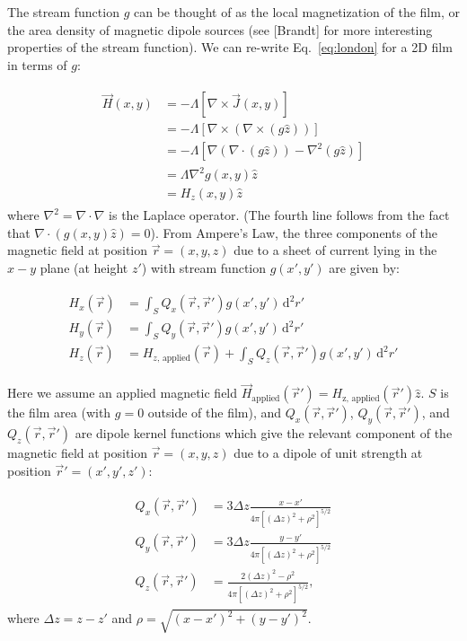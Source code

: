 \documentclass{article}
\begin{document}
The stream function $g$ can be thought of as the local magnetization of the film, or the area density of magnetic dipole sources (see [Brandt] for more interesting properties of the stream function). We can re-write Eq.~\ref{eq:london} for a 2D film in terms of $g$:

\begin{align}
    \label{eq:london_stream}
    \begin{split}
        \vec{H}(x, y) &= -\Lambda\left[\nabla\times\vec{J}(x, y)\right]\\
        &= -\Lambda\left[\nabla\times\left(\nabla\times(g\hat{z})\right)\right]\\
        &= -\Lambda\left[\nabla(\nabla\cdot(g\hat{z}))-\nabla^2(g\hat{z})\right]\\
        &=\Lambda\nabla^2g(x,y)\hat{z}\\
        &=H_z(x, y)\hat{z}
    \end{split}
\end{align}
where $\nabla^2=\nabla\cdot\nabla$ is the Laplace operator. (The fourth line follows from the fact that $\nabla\cdot\left(g(x,y)\hat{z}\right) = 0$). From Ampere's Law, the three components of the magnetic field at position $\vec{r}=(x, y, z)$ due to a sheet of current lying in the $x-y$ plane (at height $z'$) with stream function $g(x', y')$ are given by:

\begin{align}
    \label{eq:field_from_kernel}
    \begin{split}
        H_x(\vec{r}) &= \int_S Q_x(\vec{r},\vec{r}')g(x', y')\,\mathrm{d}^2r'\\
        H_y(\vec{r}) &= \int_S Q_y(\vec{r},\vec{r}')g(x', y')\,\mathrm{d}^2r'\\
        H_z(\vec{r}) &= H_{z,\,\mathrm{applied}}(\vec{r})
        + \int_S Q_z(\vec{r},\vec{r}')g(x', y')\,\mathrm{d}^2r'  
    \end{split}
\end{align}

Here we assume an applied magnetic field $\vec{H}_\mathrm{applied}(\vec{r}')=H_\mathrm{z,\,\mathrm{applied}}(\vec{r}')\hat{z}$. $S$ is the film area (with $g = 0$ outside of the film), and $Q_x(\vec{r},\vec{r}')$, $Q_y(\vec{r},\vec{r}')$, and $Q_z(\vec{r},\vec{r}')$ are dipole kernel functions which give the relevant component of the magnetic field at position $\vec{r}=(x, y, z)$ due to a dipole of unit strength at position $\vec{r}'=(x', y', z')$:

\begin{align}
    \label{eq:kernels}
    \begin{split}
        Q_x(\vec{r}, \vec{r}') &=  3\Delta z\frac{x-x'}
        {4\pi[(\Delta z)^2+\rho^2]^{5/2}}\\
        Q_y(\vec{r}, \vec{r}') &=  3\Delta z\frac{y-y'}
        {4\pi[(\Delta z)^2+\rho^2]^{5/2}}\\
        Q_z(\vec{r}, \vec{r}') &=  \frac{2(\Delta z)^2-\rho^2}
        {4\pi[(\Delta z)^2+\rho^2]^{5/2}},
    \end{split}
\end{align}
where $\Delta z = z - z'$ and $\rho=\sqrt{(x-x')^2 + (y-y')^2}$.
\end{document}
